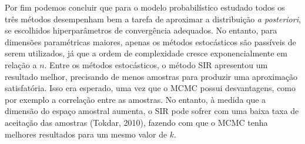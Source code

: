 Por fim podemos concluir que para o modelo probabilístico estudado todos os três métodos desempenham bem a tarefa de aproximar a distribuição \textit{a posteriori}, se escolhidos hiperparâmetros de convergência adequados. No entanto, para dimensões paramétricas maiores, apenas os métodos estocásticos são passíveis de serem utilizados, já que a ordem de complexidade cresce exponencialmente em relação a $n$. Entre os métodos estocásticos, o método SIR apresentou um resultado melhor, precisando de menos amostras para produzir uma aproximação satisfatória. Isso era esperado, uma vez que o MCMC possui desvantagens, como por exemplo a correlação entre as amostras. No entanto, à medida que a dimensão do espaço amostral aumenta, o SIR pode sofrer com uma baixa taxa de aceitação das amostras (Tokdar, 2010)\cite{Tokdar2010}, fazendo com que o MCMC tenha melhores resultados para um mesmo valor de $k$.